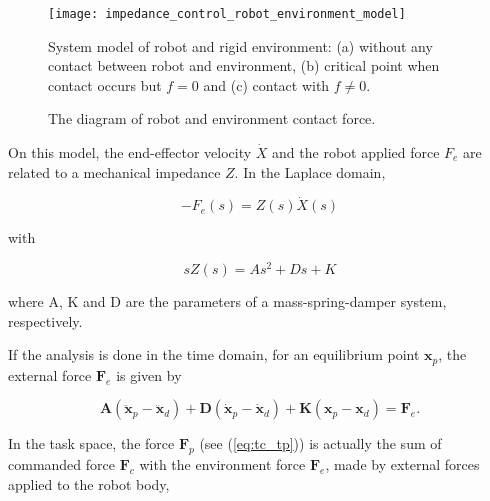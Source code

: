 \begin{figure*}[htbp]
	\begin{minipage}[b]{.48\textwidth}
	\centering
	\texttt{[image: impedance\_control\_robot\_environment\_model]}
	\caption[System model of robot and rigid environment.]{System model of robot and rigid environment: (a) without any contact between robot and environment, (b) critical point when contact occurs but $f = 0$ and (c) contact with $f \neq 0$. \cite{Duan2018_adaptive_variable_impedance_control}}
	\label{fig:impedance_control_robot_environment_model}
	\end{minipage}%
	\hfill
	\begin{minipage}[b]{.48\textwidth}
	\centering
	\caption[The diagram of robot and environment contact force.]{The diagram of robot and environment contact force. \cite{Duan2018_adaptive_variable_impedance_control}}
	\label{fig:impedance_control_robot_environment_force}
	\end{minipage}
\end{figure*}

On this model, the end-effector velocity $\dot{X}$ and the robot applied force $F_e$ are related to a mechanical impedance $Z$. In the Laplace domain,

\begin{equation}
    \label{eq:impedance_and_force}
    -F_e(s) = Z(s) \dot{X}(s)
\end{equation}

with

\begin{equation}
    \label{eq:impedance_model}
    sZ(s) = As^2 + Ds + K
\end{equation}

where A, K and D are the parameters of a mass-spring-damper system, respectively.

If the analysis is done in the time domain, for an equilibrium point $\boldsymbol{x}_p$, the external force $\boldsymbol{F}_e$ is given by

\begin{equation}
    \label{eq:impedance_time_domain}
    \boldsymbol{A}(\boldsymbol{\ddot{x}}_p - \boldsymbol{\ddot{x}}_d)+\boldsymbol{D}(\boldsymbol{\dot{x}}_p - \boldsymbol{\dot{x}}_d) + \boldsymbol{K}(\boldsymbol{x}_p - \boldsymbol{x}_d) = \boldsymbol{F}_e.
\end{equation}

In the task space, the force $\boldsymbol{F}_p$ (see (\ref{eq:tc_tp})) is actually the sum of commanded force $\boldsymbol{F}_c$ with the environment force $\boldsymbol{F}_e$, made by external forces applied to the robot body, 

